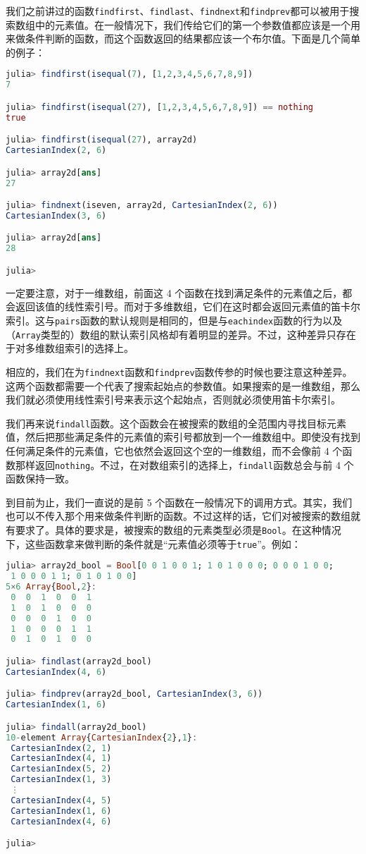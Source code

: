 我们之前讲过的函数\verb|findfirst|、\verb|findlast|、\verb|findnext|和\verb|findprev|都可以被用于搜索数组中的元素值。在一般情况下，我们传给它们的第一个参数值都应该是一个用来做条件判断的函数，而这个函数返回的结果都应该一个布尔值。下面是几个简单的例子：

\begin{lstlisting}[language=julia]
julia> findfirst(isequal(7), [1,2,3,4,5,6,7,8,9])
7

julia> findfirst(isequal(27), [1,2,3,4,5,6,7,8,9]) == nothing
true

julia> findfirst(isequal(27), array2d)
CartesianIndex(2, 6)

julia> array2d[ans]
27

julia> findnext(iseven, array2d, CartesianIndex(2, 6))
CartesianIndex(3, 6)

julia> array2d[ans]
28

julia> 
\end{lstlisting}

一定要注意，对于一维数组，前面这 4 个函数在找到满足条件的元素值之后，都会返回该值的线性索引号。而对于多维数组，它们在这时都会返回元素值的笛卡尔索引。这与\verb|pairs|函数的默认规则是相同的，但是与\verb|eachindex|函数的行为以及（\verb|Array|类型的）数组的默认索引风格却有着明显的差异。不过，这种差异只存在于对多维数组索引的选择上。

相应的，我们在为\verb|findnext|函数和\verb|findprev|函数传参的时候也要注意这种差异。这两个函数都需要一个代表了搜索起始点的参数值。如果搜索的是一维数组，那么我们就必须使用线性索引号来表示这个起始点，否则就必须使用笛卡尔索引。

我们再来说\verb|findall|函数。这个函数会在被搜索的数组的全范围内寻找目标元素值，然后把那些满足条件的元素值的索引号都放到一个一维数组中。即使没有找到任何满足条件的元素值，它也依然会返回这个空的一维数组，而不会像前 4 个函数那样返回\verb|nothing|。不过，在对数组索引的选择上，\verb|findall|函数总会与前 4 个函数保持一致。

到目前为止，我们一直说的是前 5 个函数在一般情况下的调用方式。其实，我们也可以不传入那个用来做条件判断的函数。不过这样的话，它们对被搜索的数组就有要求了。具体的要求是，被搜索的数组的元素类型必须是\verb|Bool|。在这种情况下，这些函数拿来做判断的条件就是“元素值必须等于\verb|true|”。例如：

\begin{lstlisting}[language=julia]
julia> array2d_bool = Bool[0 0 1 0 0 1; 1 0 1 0 0 0; 0 0 0 1 0 0;
 1 0 0 0 1 1; 0 1 0 1 0 0]
5×6 Array{Bool,2}:
 0  0  1  0  0  1
 1  0  1  0  0  0
 0  0  0  1  0  0
 1  0  0  0  1  1
 0  1  0  1  0  0

julia> findlast(array2d_bool)
CartesianIndex(4, 6)

julia> findprev(array2d_bool, CartesianIndex(3, 6))
CartesianIndex(1, 6)

julia> findall(array2d_bool)
10-element Array{CartesianIndex{2},1}:
 CartesianIndex(2, 1)
 CartesianIndex(4, 1)
 CartesianIndex(5, 2)
 CartesianIndex(1, 3)
 ⋮                   
 CartesianIndex(4, 5)
 CartesianIndex(1, 6)
 CartesianIndex(4, 6)

julia> 
\end{lstlisting}

